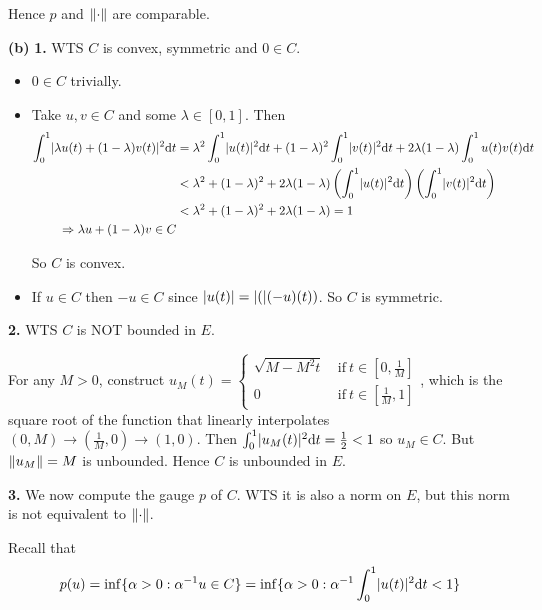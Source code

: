 \documentclass[a4paper, 10pt]{article}
\begin{document}
\begin{solution}
    Hence $p$ and $\lVert\cdot\rVert$ are comparable.

    \textbf{(b)} \textbf{1.} WTS $C$ is convex, symmetric and $0 \in C$.

    \begin{itemize}
        \item $0 \in C$ trivially.
        \item Take $u, v \in C$ and some $\lambda \in [0, 1]$. Then
        \begin{align*}
        \int_{0}^{1} \lvert\lambda u(t) + (1-\lambda)v(t)\rvert^2 \mathrm{d} t &= \lambda^2 \int_{0}^{1} \lvert u(t)\rvert^2 \mathrm{d} t + (1-\lambda)^2 \int_{0}^{1} \lvert v(t)\rvert^2 \mathrm{d} t + 2\lambda(1-\lambda)\int_{0}^{1} u(t) v(t) \mathrm{d} t \\
        &< \lambda^2 + (1 - \lambda)^2 + 2\lambda (1 - \lambda)\left(\int_{0}^{1} \lvert u(t)\rvert^2 \mathrm{d} t\right)\left(\int_{0}^{1} \lvert v(t)\rvert^2 \mathrm{d} t\right) \\
        &< \lambda^2 + (1 - \lambda)^2 + 2\lambda (1 - \lambda) = 1 \\
        \Rightarrow \lambda u + (1 - \lambda)v \in C
        \end{align*}

        So $C$ is convex.

        \item If $u \in C$ then $-u \in C$ since $\lvert u(t)\rvert = \lvert(\rvert(-u)(t))$. So $C$ is symmetric.
    \end{itemize}

    \textbf{2.} WTS $C$ is NOT bounded in $E$.

    For any $M > 0$, construct $u_M(t) = \begin{cases}
    \sqrt{M - M^2t} & \:\text{if}\: t \in [0, \frac{1}{M}] \\
    0 & \:\text{if}\: t \in [\frac{1}{M}, 1]
    \end{cases}$,
    which is the square root of the function that linearly interpolates $(0, M) \to (\frac{1}{M}, 0) \to (1, 0)$. Then $\int_{0}^{1} \lvert u_M(t)\rvert^2 \mathrm{d} t = \frac{1}{2} < 1 $ so $u_M \in C$. But $\lVert u_M\rVert = M$ is unbounded. Hence $C$ is unbounded in $E$.

    \textbf{3.} We now compute the gauge $p$ of $C$. WTS it is also a norm on $E$, but this norm is not equivalent to $\lVert\cdot\rVert$.

    Recall that \begin{equation*}
    p(u) = \inf \{\alpha > 0 : {\alpha}^{-1} u \in C\} = \inf \{\alpha > 0 : {\alpha}^{-1}\int_{0}^{1}\lvert u(t)\rvert^2 \mathrm{d} t < 1\}
    \end{equation*}


\end{solution}
\end{document}
